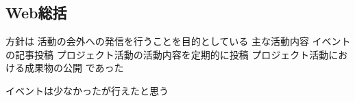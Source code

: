 \subsection*{Web総括}

方針は
    活動の会外への発信を行うことを目的としている
    主な活動内容
    イベントの記事投稿
    プロジェクト活動の活動内容を定期的に投稿
    プロジェクト活動における成果物の公開
であった

イベントは少なかったが行えたと思う
